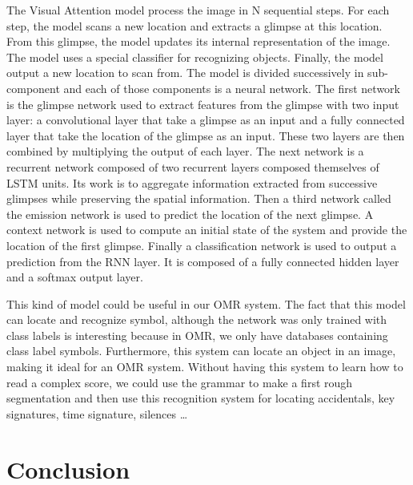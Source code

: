 \documentclass[11pt]{sdm}
\begin{document}
The Visual Attention model process the image in N sequential steps.
For each step, the model scans a new location and extracts a glimpse at this location.
From this glimpse, the model updates its internal representation of the image.
The model uses a special classifier for recognizing objects.
Finally, the model output a new location to scan from.
The model is divided successively in sub-component and each of those components is a neural network.
The first network is the glimpse network used to extract features from the glimpse with two input layer: a convolutional layer that take a glimpse as an input and a fully connected layer that take the location of the glimpse as an input.
These two layers are then combined by multiplying the output of each layer.
The next network is a recurrent network composed of two recurrent layers composed themselves of LSTM units.
Its work is to aggregate information extracted from successive glimpses while preserving the spatial information.
Then a third network called the emission network is used to predict the location of the next glimpse.
A context network is used to compute an initial state of the system and provide the location of the first glimpse.
Finally a classification network is used to output a prediction from the RNN layer.
It is composed of a fully connected hidden layer and a softmax output layer.

This kind of model could be useful in our OMR system.
The fact that this model can locate and recognize symbol, although the network was only trained with class labels is interesting because in OMR, we only have databases containing class label symbols.
Furthermore, this system can locate an object in an image, making it ideal for an OMR system.
Without having this system to learn how to read a complex score, we could use the grammar to make a first rough segmentation and then use this recognition system for locating accidentals, key signatures, time signature, silences \ldots

\section{Conclusion}
\end{document}
